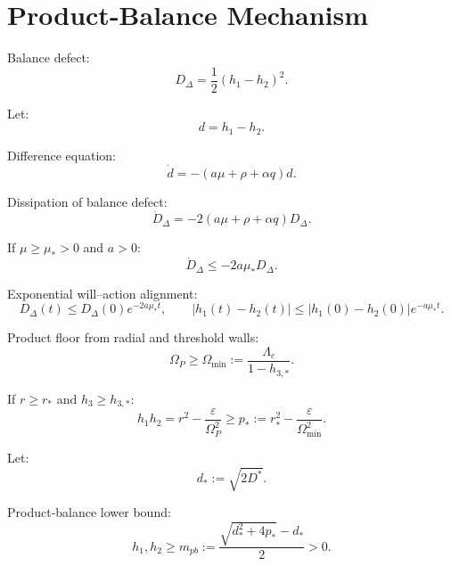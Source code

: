 \documentclass[11pt,a4paper]{article}
\newcommand{\Om}{\Omega_P}
\theoremstyle{plain}
\theoremstyle{definition}
\theoremstyle{remark}
\begin{document}
\section{Product-Balance Mechanism}

Balance defect:
\begin{equation}
  D_\Delta=\frac12(h_1-h_2)^2.
\end{equation}

Let:
\begin{equation}
  d=h_1-h_2.
\end{equation}

Difference equation:
\begin{equation}
  \dot d=-(a\mu+\rho+\alpha q)d.
\end{equation}

Dissipation of balance defect:
\begin{equation}
  \dot D_\Delta=-2(a\mu+\rho+\alpha q)D_\Delta.
\end{equation}

If $\mu\ge\mu_*>0$ and $a>0$:
\begin{equation}
  \dot D_\Delta\le -2a\mu_*D_\Delta.
\end{equation}

Exponential will--action alignment:
\begin{equation}
  D_\Delta(t)\le D_\Delta(0)e^{-2a\mu_*t},
  \qquad
  |h_1(t)-h_2(t)|\le |h_1(0)-h_2(0)|e^{-a\mu_*t}.
\end{equation}

Product floor from radial and threshold walls:
\begin{equation}
  \Om\ge \Omega_{\min}:=\frac{\Lambda_c}{1-h_{3,*}}.
\end{equation}

If $r\ge r_*$ and $h_3\ge h_{3,*}$:
\begin{equation}
  h_1h_2=r^2-\frac{\varepsilon}{\Om^2}
  \ge p_*:=r_*^2-\frac{\varepsilon}{\Omega_{\min}^2}.
\end{equation}

Let:
\begin{equation}
  d_*:=\sqrt{2D^*}.
\end{equation}

Product-balance lower bound:
\begin{equation}
  h_1,h_2\ge m_{pb}:=\frac{\sqrt{d_*^2+4p_*}-d_*}{2}>0.
\end{equation}

\end{document}
